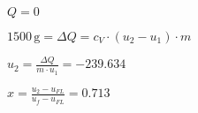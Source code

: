 \( Q = 0 \)  

\( 1500 \, \text{g} = \Delta Q = c_V \cdot (u_2 - u_1) \cdot m \)  

\( u_2 = \frac{\Delta Q}{m \cdot u_1} = -239.634 \)  

\( x = \frac{u_2 - u_{FL}}{u_f - u_{FL}} = 0.713 \)